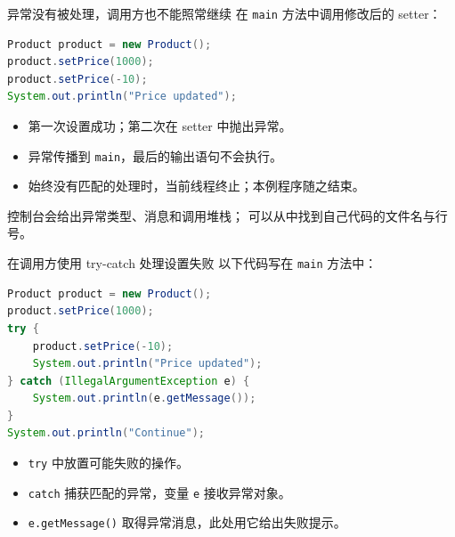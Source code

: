 \documentclass[aspectratio=169]{beamer}
\begin{document}
\begin{frame}[fragile]{异常没有被处理，调用方也不能照常继续}
  在 \texttt{main} 方法中调用修改后的 setter：
  \begin{lstlisting}[language=Java]
Product product = new Product();
product.setPrice(1000);
product.setPrice(-10);
System.out.println("Price updated");
  \end{lstlisting}
  \begin{itemize}
    \item 第一次设置成功；第二次在 setter 中抛出异常。
    \item 异常传播到 \texttt{main}，最后的输出语句不会执行。
    \item 始终没有匹配的处理时，当前线程终止；本例程序随之结束。
  \end{itemize}
  \medskip
  控制台会给出异常类型、消息和调用堆栈；
  可以从中找到自己代码的文件名与行号。
\end{frame}

\begin{frame}[fragile]{在调用方使用 try-catch 处理设置失败}
  以下代码写在 \texttt{main} 方法中：
  \begin{lstlisting}[language=Java]
Product product = new Product();
product.setPrice(1000);
try {
    product.setPrice(-10);
    System.out.println("Price updated");
} catch (IllegalArgumentException e) {
    System.out.println(e.getMessage());
}
System.out.println("Continue");
  \end{lstlisting}
  \begin{itemize}
    \item \texttt{try} 中放置可能失败的操作。
    \item \texttt{catch} 捕获匹配的异常，变量 \texttt{e} 接收异常对象。
    \item \texttt{e.getMessage()} 取得异常消息，此处用它给出失败提示。
  \end{itemize}
\end{frame}
\end{document}
